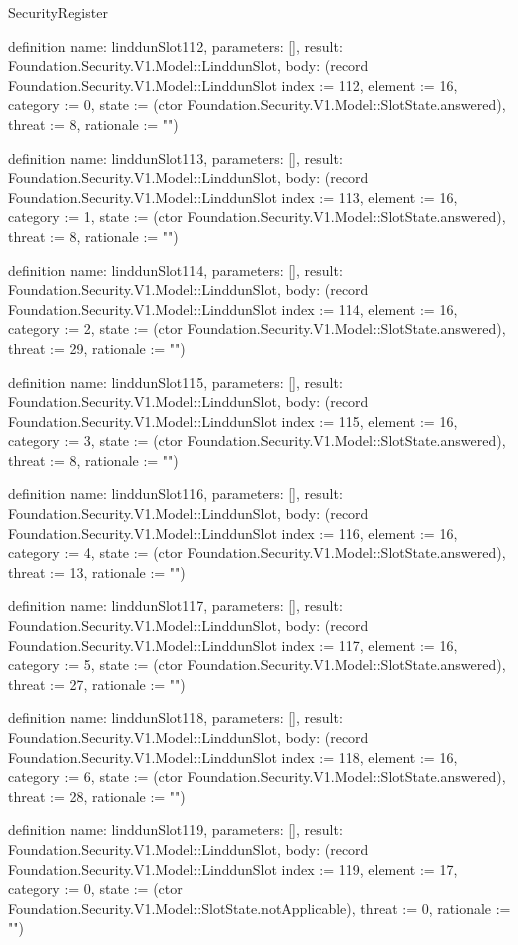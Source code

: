 \begin{lexlean}{SecurityRegister}
\begin{semanticmodule}
definition{
  name: linddunSlot112,
  parameters: [],
  result: Foundation.Security.V1.Model::LinddunSlot,
  body: (record Foundation.Security.V1.Model::LinddunSlot {index := 112, element := 16, category := 0, state := (ctor Foundation.Security.V1.Model::SlotState.answered), threat := 8, rationale := ""})
}

definition{
  name: linddunSlot113,
  parameters: [],
  result: Foundation.Security.V1.Model::LinddunSlot,
  body: (record Foundation.Security.V1.Model::LinddunSlot {index := 113, element := 16, category := 1, state := (ctor Foundation.Security.V1.Model::SlotState.answered), threat := 8, rationale := ""})
}

definition{
  name: linddunSlot114,
  parameters: [],
  result: Foundation.Security.V1.Model::LinddunSlot,
  body: (record Foundation.Security.V1.Model::LinddunSlot {index := 114, element := 16, category := 2, state := (ctor Foundation.Security.V1.Model::SlotState.answered), threat := 29, rationale := ""})
}

definition{
  name: linddunSlot115,
  parameters: [],
  result: Foundation.Security.V1.Model::LinddunSlot,
  body: (record Foundation.Security.V1.Model::LinddunSlot {index := 115, element := 16, category := 3, state := (ctor Foundation.Security.V1.Model::SlotState.answered), threat := 8, rationale := ""})
}

definition{
  name: linddunSlot116,
  parameters: [],
  result: Foundation.Security.V1.Model::LinddunSlot,
  body: (record Foundation.Security.V1.Model::LinddunSlot {index := 116, element := 16, category := 4, state := (ctor Foundation.Security.V1.Model::SlotState.answered), threat := 13, rationale := ""})
}

definition{
  name: linddunSlot117,
  parameters: [],
  result: Foundation.Security.V1.Model::LinddunSlot,
  body: (record Foundation.Security.V1.Model::LinddunSlot {index := 117, element := 16, category := 5, state := (ctor Foundation.Security.V1.Model::SlotState.answered), threat := 27, rationale := ""})
}

definition{
  name: linddunSlot118,
  parameters: [],
  result: Foundation.Security.V1.Model::LinddunSlot,
  body: (record Foundation.Security.V1.Model::LinddunSlot {index := 118, element := 16, category := 6, state := (ctor Foundation.Security.V1.Model::SlotState.answered), threat := 28, rationale := ""})
}

definition{
  name: linddunSlot119,
  parameters: [],
  result: Foundation.Security.V1.Model::LinddunSlot,
  body: (record Foundation.Security.V1.Model::LinddunSlot {index := 119, element := 17, category := 0, state := (ctor Foundation.Security.V1.Model::SlotState.notApplicable), threat := 0, rationale := ""})
}


\end{semanticmodule}
\end{lexlean}
